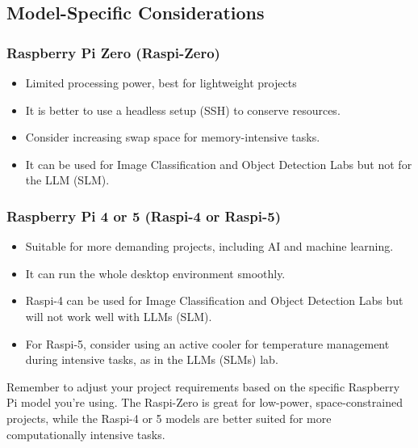 \documentclass[
]{article}
\providecommand{\tightlist}{%
  \setlength{\itemsep}{0pt}\setlength{\parskip}{0pt}}\usepackage{longtable,booktabs,array}
\begin{document}
\subsection{Model-Specific
Considerations}\label{sec-setup-modelspecific-considerations-8f09}

\subsubsection{Raspberry Pi Zero
(Raspi-Zero)}\label{sec-setup-raspberry-pi-zero-raspizero-f33d}

\begin{itemize}
\tightlist
\item
  Limited processing power, best for lightweight projects
\item
  It is better to use a headless setup (SSH) to conserve resources.
\item
  Consider increasing swap space for memory-intensive tasks.
\item
  It can be used for Image Classification and Object Detection Labs but
  not for the LLM (SLM).
\end{itemize}

\subsubsection{Raspberry Pi 4 or 5 (Raspi-4 or
Raspi-5)}\label{sec-setup-raspberry-pi-4-5-raspi4-raspi5-d816}

\begin{itemize}
\tightlist
\item
  Suitable for more demanding projects, including AI and machine
  learning.
\item
  It can run the whole desktop environment smoothly.
\item
  Raspi-4 can be used for Image Classification and Object Detection Labs
  but will not work well with LLMs (SLM).
\item
  For Raspi-5, consider using an active cooler for temperature
  management during intensive tasks, as in the LLMs (SLMs) lab.
\end{itemize}

Remember to adjust your project requirements based on the specific
Raspberry Pi model you're using. The Raspi-Zero is great for low-power,
space-constrained projects, while the Raspi-4 or 5 models are better
suited for more computationally intensive tasks.
\end{document}
